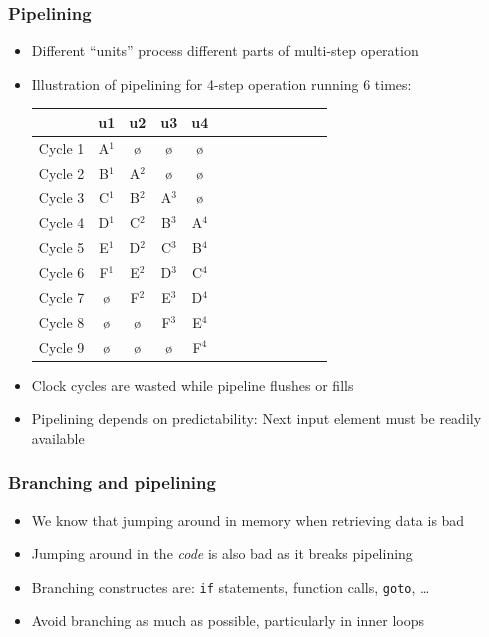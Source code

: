 \documentclass[usenames,dvipsnames,mathserif,compress]{beamer}
\begin{document}
\begin{frame}
  \frametitle{Pipelining}
  \begin{itemize}
  \item Different ``units'' process different parts of multi-step operation
  \item Illustration of pipelining for 4-step operation running 6 times:\\
    \begin{table}
    \begin{tabular}{c|cccccccccccc}
      & u1 &u2&u3&u4\\\hline
      Cycle 1 & A$^1$ &ø&ø&ø \\
      Cycle 2 & B$^1$ & A$^2$ &ø&ø \\
      Cycle 3 & C$^1$ & B$^2$ & A$^3$ &ø \\
      Cycle 4 & D$^1$ & C$^2$ & B$^3$ & A$^4$  \\
      Cycle 5 & E$^1$ & D$^2$ & C$^3$ & B$^4$   \\
      Cycle 6 & F$^1$ & E$^2$ & D$^3$ & C$^4$  \\
      Cycle 7 & ø     & F$^2$ & E$^3$ & D$^4$  \\
      Cycle 8 & ø & ø & F$^3$ & E$^4$  \\
      Cycle 9 & ø & ø & ø & F$^4$  \\
    \end{tabular}
    \end{table}
  \item Clock cycles are wasted while pipeline flushes or fills
  \item Pipelining depends on predictability: Next input element must be readily available
  \end{itemize}
\end{frame}

\begin{frame}
  \frametitle{Branching and pipelining}
  \begin{itemize}
  \item We know that jumping around in memory when retrieving data is bad
  \item Jumping around in the \emph{code} is also bad as it breaks pipelining
  \item Branching constructes are: \texttt{if} statements, function calls, \texttt{goto}, \ldots
  \item Avoid branching as much as possible, particularly in inner loops
  \end{itemize}
\end{frame}
\end{document}
